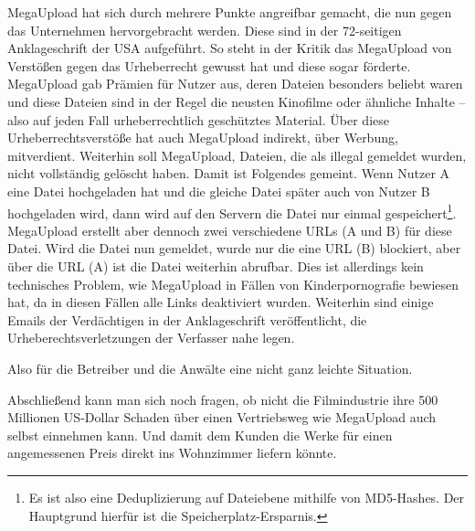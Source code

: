 MegaUpload hat sich durch mehrere Punkte angreifbar gemacht, die nun gegen das Unternehmen
hervorgebracht werden.
Diese sind in der 72-seitigen Anklageschrift \cite{Anklageschrift} der USA aufgeführt.
So steht in
der Kritik das MegaUpload von Verstößen gegen das Urheberrecht gewusst hat und diese sogar förderte.
MegaUpload gab Prämien für Nutzer aus, deren Dateien besonders beliebt waren und diese Dateien sind
in der Regel die neusten Kinofilme oder ähnliche Inhalte -- also auf jeden Fall urheberrechtlich
geschütztes Material. Über diese Urheberrechtsverstöße hat auch MegaUpload indirekt, über Werbung,
mitverdient. Weiterhin soll MegaUpload, Dateien, die als illegal gemeldet wurden, nicht vollständig
gelöscht haben. Damit ist Folgendes gemeint. Wenn Nutzer A eine Datei hochgeladen hat und die
gleiche Datei später auch von Nutzer B hochgeladen wird, dann wird auf den Servern die Datei nur
einmal gespeichert\footnote{Es ist also eine Deduplizierung auf Dateiebene mithilfe von
MD5-Hashes. Der Hauptgrund hierfür ist die Speicherplatz-Ersparnis.}.
MegaUpload erstellt aber dennoch zwei verschiedene URLs (A und B) für diese Datei. Wird die
Datei nun gemeldet, wurde nur die eine URL (B) blockiert, aber über die URL (A) ist die Datei
weiterhin abrufbar. Dies ist allerdings kein technisches Problem, wie
MegaUpload in Fällen von Kinderpornografie bewiesen hat, da in diesen Fällen alle Links deaktiviert
wurden.
Weiterhin sind einige Emails der Verdächtigen in der Anklageschrift veröffentlicht, die
Urheberechtsverletzungen der Verfasser nahe legen.

Also für die Betreiber und die Anwälte eine nicht ganz leichte Situation.

\bigskip
Abschließend kann man sich noch fragen, ob nicht die Filmindustrie ihre 500 Millionen US-Dollar
Schaden \cite{Anklageschrift} über einen Vertriebsweg wie MegaUpload auch selbst einnehmen kann.
Und damit dem Kunden die Werke für einen angemessenen Preis direkt ins Wohnzimmer liefern könnte.
